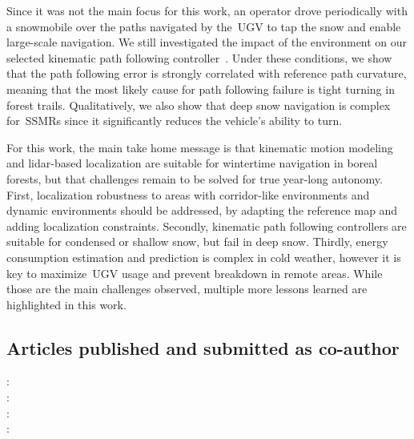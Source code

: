 Since it was not the main focus for this work, an operator drove periodically with a snowmobile over the paths navigated by the~\ac{UGV} to tap the snow and enable large-scale navigation.
We still investigated the impact of the environment on our selected kinematic path following controller~\citep{Huskic2017}.
Under these conditions, we show that the path following error is strongly correlated with reference path curvature, meaning that the most likely cause for path following failure is tight turning in forest trails.
Qualitatively, we also show that deep snow navigation is complex for~\acp{SSMR} since it significantly reduces the vehicle's ability to turn.

For this work, the main take home message is that kinematic motion modeling and lidar-based localization are suitable for wintertime navigation in boreal forests, but that challenges remain to be solved for true year-long autonomy.
First, localization robustness to areas with corridor-like environments and dynamic environments should be addressed, by adapting the reference map and adding localization constraints.
Secondly, kinematic path following controllers are suitable for condensed or shallow snow, but fail in deep snow.
Thirdly, energy consumption estimation and prediction is complex in cold weather, however it is key to maximize~\ac{UGV} usage and prevent breakdown in remote areas.
While those are the main challenges observed, multiple more lessons learned are highlighted in this work.

\subsection{Articles published and submitted as co-author}

\textbf{}: 
\lightlipsum[1-1]
\\

\textbf{}:
\lightlipsum[1-1] 
\\

\textbf{}:
\lightlipsum[1-1]
\\

\textbf{}:
\lightlipsum[1-1]
\\